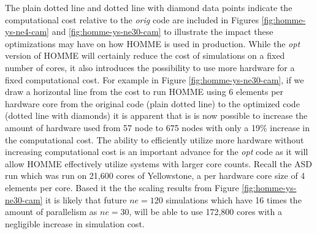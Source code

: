 The plain dotted line and dotted line with diamond data points indicate the computational cost relative to the {\em orig} code are included in Figures \ref{fig:homme-ys-ne4-cam} and \ref{fig:homme-ys-ne30-cam} to illustrate the impact these optimizations may have on how HOMME is used in production.  While the {\em opt} version of HOMME will certainly reduce the cost of simulations on a fixed number of cores, it also introduces the possibility to use more hardware for a fixed computational cost.  For example in Figure \ref{fig:homme-ys-ne30-cam}, if we draw a horizontal line from the cost to run HOMME using 6 elements per hardware core from the original code (plain dotted line) to the optimized code (dotted line with diamonds) it is apparent that is is now possible to increase the amount of hardware used from 57 node to 675 nodes with only a 19\% increase in the computational cost.  The ability to efficiently utilize more hardware without increasing computational cost is an important advance for the {\em opt} code as it will allow HOMME effectively utilize systems with larger core counts.  Recall the ASD run which was run on 21,600 cores of Yellowstone, a per hardware core size of 4 elements per core.  Based it the the scaling results from Figure \ref{fig:homme-ys-ne30-cam} it is likely that future $ne=120$ simulations which have 16 times the amount of parallelism as $ne=30$, will be able to use 172,800 cores with a negligible increase in simulation cost.  

